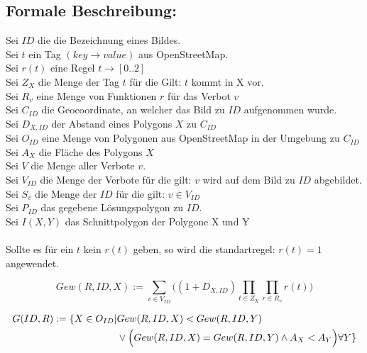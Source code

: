 \subsection{Formale Beschreibung:}
Sei $ID$ die die Bezeichnung eines Bildes.\\
Sei $t$ ein Tag $(key \to value)$ aus OpenStreetMap.\\
Sei $r(t)$ eine Regel $t \to [0..2]$ \\
Sei $Z_{X}$ die Menge der Tag $t$ für die Gilt: $t$ kommt in X vor. \\
Sei $R_v$ eine Menge von Funktionen $r$ für das Verbot $v$\\
Sei $C_{ID}$ die Geocoordinate, an welcher das Bild zu $ID$ aufgenommen wurde. \\
Sei $D_{X,ID}$ der Abstand eines Polygons $X$ zu $C_{ID}$ \\
Sei $O_{ID}$ eine Menge von Polygonen aus OpenStreetMap in der Umgebung zu $C_{ID}$\\
Sei $A_{X}$ die Fläche des Polygons $X$\\
Sei $V$ die Menge aller Verbote $v$.\\
Sei $V_{ID}$ die Menge der Verbote für die gilt: $v$ wird auf dem Bild zu $ID$ abgebildet.\\
Sei $S_{v}$ die Menge der $ID$ für die gilt: $v \in V_{ID}$\\
Sei $P_{ID}$ das gegebene Lösungspolygon zu $ID$.\\
Sei $I(X,Y)$ das Schnittpolygon der Polygone X und Y\\
\\
Sollte es für ein $t$ kein $r(t)$ geben, so wird die standartregel:
$r(t) = 1$ angewendet.

\begin{equation}
Gew(R,ID,X) := \sum_{v \in V_{ID}} \Big((1 + D_{X,ID})\prod_{t \in Z_X} \prod_{r \in R_v} r(t)\Big)
\end{equation}

\begin{align}
G(ID,R) := \{X \in O_{ID} | & Gew(R,ID,X) < Gew(R,ID,Y)\\
& \lor \Big(Gew(R,ID,X)=Gew(R,ID,Y) \land A_X < A_Y\Big) \forall Y\} \notag
\end{align}

